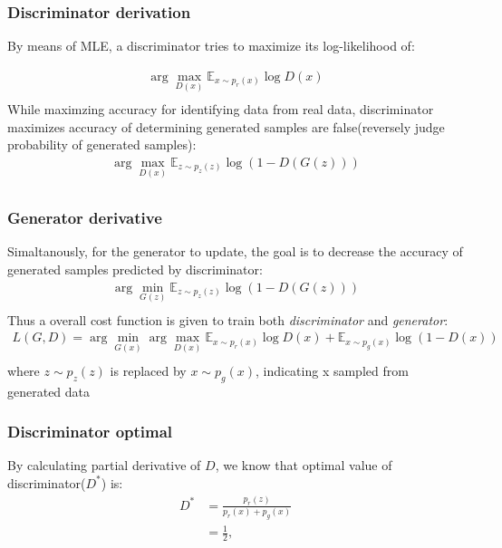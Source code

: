 \documentclass{article}
\newcommand{\argmax}{\arg\!\max}
\newcommand{\argmin}{\arg\!\min}
\begin{document}
\subsubsection*{Discriminator derivation}
By means of MLE, a discriminator tries to maximize its log-likelihood of:

\begin{equation}
\begin{gathered}
\argmax_{D(x)} \mathbb{E}_{x\sim p_{r}(x)} \log{D(x)}\\
\end{gathered}
\end{equation}
While maximzing accuracy for identifying data from real data, discriminator maximizes accuracy of determining generated samples are false(reversely judge probability of generated samples):
\begin{equation}
    \begin{gathered}
\argmax_{D(x)} \mathbb{E}_{z\sim p_{z}(z)} \log{(1-D(G(z)))}\\
    \end{gathered}
\end{equation}
\subsubsection*{Generator derivative}
Simaltanously, for the generator to update, the goal is to decrease the accuracy of generated samples predicted by discriminator:
\begin{equation}
    \begin{gathered}
\argmin_{G(z)} \mathbb{E}_{z\sim p_{z}(z)} \log{(1-D(G(z)))}\\
    \end{gathered}
\end{equation}
Thus a overall cost function is given to train both \textit{discriminator} and \textit{generator}:
\begin{equation}
    \begin{gathered}
\textit{L}(G,D) = \argmin_{G(x)} \argmax_{D(x)} \mathbb{E}_{x\sim p_{r}(x)} \log{D(x)} + \mathbb{E}_{x\sim p_{g}(x)} \log{(1-D(x))}\\
    \end{gathered}
\end{equation}
where $z\sim p_z{(z)}$ is replaced by $x\sim p_g{(x)}$, indicating x sampled from generated data 
\subsubsection*{Discriminator optimal}
By calculating partial derivative of $D$, we know that optimal value of discriminator($D^*$) is:
\begin{align}\label{eq5}
D^{*} &= \frac{p_{r}(z)}{p_{r}(x)+p_{g}(x)} \nonumber\\
&= \frac{1}{2},
\end{align}
\end{document}
